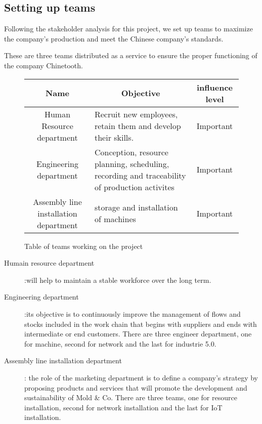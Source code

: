 \subsection{Setting up teams}

Following the stakeholder analysis for this project, we set up teams to maximize the company's production and meet the Chinese company's standards.

These are three teams distributed as a service to ensure the proper functioning of the company Chinetooth.

\begin{figure}[h]
\centering
\begin{tabular}{| c | p{6cm} | c |}
    \hline
    \rowcolor{heading-color}Name & \multicolumn{1}{c|}{Objective} & influence level \\
    \hline
    Human Resource department & Recruit new employees, retain them and develop their skills. & Important \\
    \hline
    Engineering department & Conception, resource planning, scheduling, recording and traceability of production activites & Important \\
    \hline 
    Assembly line installation department & storage and installation of machines & Important \\
    \hline 
\end{tabular}
\caption{Table of teams working on the project}
\end{figure}

\begin{description}
    \item[Humain resource department]:will help to maintain a stable workforce over the long term.
    \item[Engineering department]:its objective is to continuously improve the management of flows and stocks included in the work chain that begins with suppliers and ends with intermediate or end customers. There are three engineer department, one for machine, second for network and the last for industrie 5.0.
    \item[Assembly line installation department]: the role of the marketing department is to define a company's strategy by proposing products and services that will promote the development and sustainability of Mold \& Co. There are three teams, one for resource installation, second for network installation and the last for IoT installation.
\end{description} 
